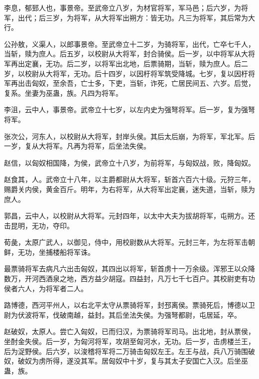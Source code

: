 \documentclass[12pt,UTF8]{ctexbook}
\begin{document}
李息，郁郅人也，事景帝。至武帝立八岁，为材官将军，军马邑；后六岁，为将军，出代；后三岁，为将军，从大将军出朔方：皆无功。凡三为将军，其后常为大行。



公孙敖，义渠人，以郎事景帝。至武帝立十二岁，为骑将军，出代，亡卒七千人，当斩，赎为庶人。后五岁，以校尉从大将军，封合骑侯。后一岁，以中将军从大将军再出定襄，无功。后二岁，以将军出北地，后票骑期，当斩，赎为庶人。后二岁，以校尉从大将军，无功。后十四岁，以因杅将军筑受降城。七岁，复以因杅将军再出击匈奴，至余吾，亡士多，下吏，当斩，诈死，亡居民间五、六岁。后觉，复系。坐妻为巫蛊，族。凡四为将军。



李沮，云中人，事景帝。武帝立十七岁，以左内史为强弩将军。后一岁，复为强弩将军。



张次公，河东人，以校尉从大将军，封岸头侯。其后太后崩，为将军，军北军。后一岁，复从大将军。凡再为将军，后坐法失侯。



赵信，以匈奴相国降，为侯，武帝立十八岁，为前将军，与匈奴战，败，降匈奴。



赵食其，人。武帝立十八年，以主爵都尉从大将军，斩首六百六十级。元狩三年，赐爵关内侯，黄金百斤。明年，为右将军，从大将军出定襄，迷失道，当斩，赎为庶人。



郭昌，云中人，以校尉从大将军。元封四年，以太中大夫为拔胡将军，屯朔方。还击昆明，无功，夺印。



荀彘，太原广武人，以御见，侍中，用校尉数从大将军。元封三年，为左将军击朝鲜，无功，坐捕楼船将军诛。



最票骑将军去病凡六出击匈奴，其四出以将军，斩首虏十一万余级。浑邪王以众降数万，开河西酒泉之地，西方益少胡寇。四益封，凡万七千七百户。其校尉吏有功侯者六人，为将军者二人。



路博德，西河平州人，以右北平太守从票骑将军，封邳离侯。票骑死后，博德以卫尉为伏波将军，伐破南越，益封。其后坐法失侯。为强弩都尉，屯居延，卒。



赵破奴，太原人。尝亡入匈奴，已而归汉，为票骑将军司马。出北地，封从票侯，坐酎金失侯。后一岁，为匈河将军，攻胡至匈河水，无功。后一岁，击虏楼兰王，后为浞野侯。后六岁，以浚稽将军将二万骑击匈奴左王。左王与战，兵八万骑围破奴，破奴为虏所得，遂没其军。居匈奴中十岁，复与其太子安国亡入汉。后坐巫蛊，族。
\end{document}
